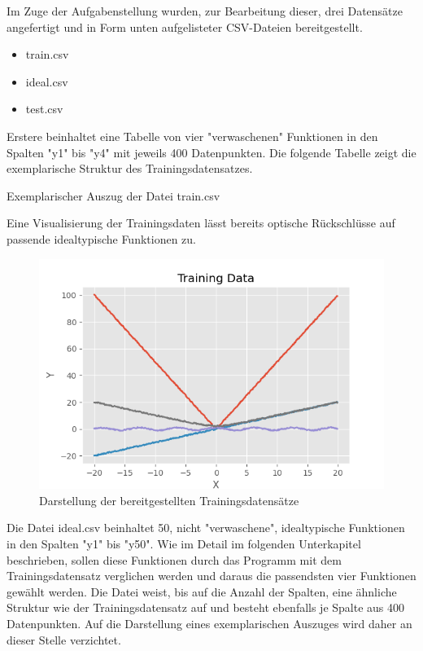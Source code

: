 Im Zuge der Aufgabenstellung wurden, zur Bearbeitung dieser, drei Datensätze angefertigt und in Form unten aufgelisteter CSV-Dateien bereitgestellt.

\begin{itemize}
 \itemsep0pt
 \item train.csv
 \item ideal.csv
 \item test.csv
\end{itemize}

Erstere beinhaltet eine Tabelle von vier "verwaschenen" Funktionen in den Spalten "y1" bis "y4" mit jeweils 400 Datenpunkten. Die folgende Tabelle zeigt die exemplarische Struktur des Trainingsdatensatzes.

\begin{table}[H]
\small
\centering
{}
\caption{Exemplarischer Auszug der Datei train.csv}
\label{tab:Exemplarischer Auszug aus train.csv}
\end{table} 


Eine Visualisierung der Trainingsdaten lässt bereits optische Rückschlüsse auf passende idealtypische Funktionen zu.
\begin{figure}[h]
\centering
\includegraphics[width=12cm]{../output/figures/train.png}
\caption{Darstellung der bereitgestellten Trainingsdatensätze \cite{Gage:18}}\label{fig:train}
\end{figure}

Die Datei ideal.csv beinhaltet 50, nicht "verwaschene", idealtypische Funktionen in den Spalten "y1" bis "y50". Wie im Detail im folgenden Unterkapitel beschrieben, sollen diese Funktionen durch das Programm mit dem Trainingsdatensatz verglichen werden und daraus die passendsten vier Funktionen gewählt werden. Die Datei weist, bis auf die Anzahl der Spalten, eine ähnliche Struktur wie der Trainingsdatensatz auf und besteht ebenfalls je Spalte aus 400 Datenpunkten. Auf die Darstellung eines exemplarischen Auszuges wird daher an dieser Stelle verzichtet.

